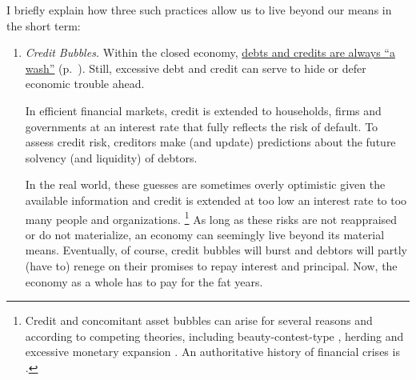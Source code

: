 I briefly explain how three such practices allow us to live beyond our means in the short term:

\begin{enumerate}
	\item {} \label{itm:credit-bubbles} \emph{Credit Bubbles.} Within the closed economy, \hyperref[itm:credits-debits-wash]{debts and credits are always ``a wash''} (p.~\pageref{itm:credits-debits-wash}).
Still, excessive debt and credit can serve to hide or defer economic trouble ahead.

	In efficient financial markets, credit is extended to households, firms and governments at an interest rate that fully reflects the risk of default.
To assess credit risk, creditors make (and update) predictions about the future solvency (and liquidity) of debtors.

	In the real world, these guesses are sometimes overly optimistic given the available information and credit is extended at too low an interest rate to too many people and organizations.
	\footnote{
		Credit and concomitant asset bubbles can arise for several reasons and according to competing theories, including beauty-contest-type \citep{Keynes1936}, herding \citep{Banerjee-1992-aa} and excessive monetary expansion \citep{Stiglitz2010}.
		An authoritative history of financial crises is \cite{KindlebergerAliber-2005-aa}.
	}
	As long as these risks are not reappraised or do not materialize, an economy can seemingly live beyond its material means.
Eventually, of course, credit bubbles will burst and debtors will partly (have to) renege on their promises to repay interest and principal.
Now, the economy as a whole has to pay for the fat years.


\end{enumerate}
